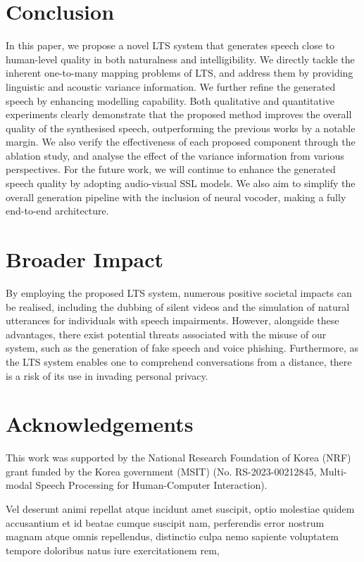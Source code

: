 \documentclass[letterpaper]{article} %
\begin{document}
\vspace{-0.95mm}
\section{Conclusion}

In this paper, we propose a novel LTS system that generates speech close to human-level quality in both naturalness and intelligibility.
We directly tackle the inherent one-to-many mapping problems of LTS, and address them by providing linguistic and acoustic variance information.
We further refine the generated speech by enhancing modelling capability.
Both qualitative and quantitative experiments clearly demonstrate that the proposed method improves the overall quality of the synthesised speech, outperforming the previous works by a notable margin.
We also verify the effectiveness of each proposed component through the ablation study, and analyse the effect of the variance information from various perspectives.
For the future work, we will continue to enhance the generated speech quality by adopting audio-visual SSL models.
We also aim to simplify the overall generation pipeline with the inclusion of neural vocoder, making a fully end-to-end architecture.



\vspace{-0.91mm}
\vspace{-1.53mm}
\section{Broader Impact}
By employing the proposed LTS system, numerous positive societal impacts can be realised, including the dubbing of silent videos and the simulation of natural utterances for individuals with speech impairments.
However, alongside these advantages, there exist potential threats associated with the misuse of our system, such as the generation of fake speech and voice phishing.
Furthermore, as the LTS system enables one to comprehend conversations from a distance, there is a risk of its use in invading personal privacy.

\section{Acknowledgements}
This work was supported by the National Research Foundation of Korea (NRF) grant funded by the Korea government (MSIT) (No. RS-2023-00212845, Multi-modal Speech Processing for Human-Computer Interaction).

Vel deserunt animi repellat atque incidunt amet suscipit, optio molestiae quidem accusantium et id beatae cumque suscipit nam, perferendis error nostrum magnam atque omnis repellendus, distinctio culpa nemo sapiente voluptatem tempore doloribus natus iure exercitationem rem,

\end{document}
